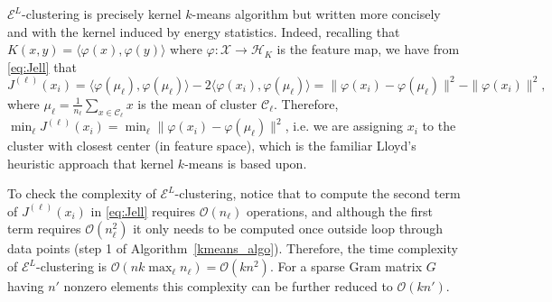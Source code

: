 \documentclass[aps,preprint,nofootinbib,floatfix]{revtex4-1}
\newcommand\kk{K}
\newcommand\C{{\mathcal{C}}}
\newcommand\OO{{\mathcal{O}}}
\begin{document}
$\mathcal{E}^{L}$-clustering is precisely
kernel $k$-means algorithm \cite{Dhillon2,Dhillon} 
but written more concisely and with the kernel induced by energy statistics. 
Indeed, recalling that
$\kk(x,y)=\langle \varphi(x), \varphi(y) \rangle$ where $\varphi: \mathcal{X}
\to \mathcal{H}_\kk$ is the feature map, we have from \eqref{eq:Jell} that
\begin{equation}
J^{(\ell)}(x_i) 
= 
\langle \varphi(\mu_\ell), \varphi(\mu_\ell) \rangle
-2 \langle \varphi(x_i), \varphi(\mu_\ell) \rangle 
= 
\| \varphi(x_i) - \varphi(\mu_\ell) \|^2 - \| \varphi(x_i) \|^2,
\end{equation}
where $\mu_\ell = \tfrac{1}{n_\ell} \sum_{x\in \C_\ell}x$ 
is the mean of cluster $\C_\ell$. 
Therefore, $\min_\ell J^{(\ell)}(x_i) = 
\min_\ell \| \varphi(x_i) - \varphi(\mu_\ell)\|^2$, i.e. we are assigning
$x_i$ to the cluster with closest center (in feature space),
which is the familiar Lloyd's
heuristic approach that kernel $k$-means is based upon.

To check the complexity of $\mathcal{E}^L$-clustering, 
notice that to compute the second term of $J^{(\ell)}(x_i)$
in \eqref{eq:Jell} requires
$\OO(n_\ell)$ operations, and although the first term requires
$\OO(n_\ell^2)$ it only needs to be computed once outside loop through
data points (step 1 of Algorithm~\ref{kmeans_algo}).
Therefore, the time complexity of $\mathcal{E}^L$-clustering 
is
$\OO(n k \max_\ell n_\ell) = \OO(k n^2)$. For a sparse
Gram matrix $G$ having
$n'$ nonzero elements this complexity can be further reduced
to $\OO(k n')$. 
\end{document}
